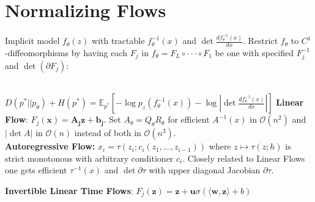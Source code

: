 
\section*{Normalizing Flows}
Implicit model $f_\theta(z)$ with tractable $f_\theta^{-1}(x)$ and $\det \frac{d f_\theta^{-1}(x)}{d x}$. Restrict $f_\theta$ to $C^1$-diffeomorphisms by having each $F_j$ in
$f_\theta=F_L\circ\cdot\cdot\cdot\circ F_1$ be one with specified $F_j^{-1}$ and $\det(\partial F_j)$:\\
\\

$D(p^*||p_\theta) + H(p^*) = \mathbb E_{p^*}[- \log p_z(f_\theta^{-1}(x)) - \log | \det \frac{d f_\theta^{-1}(x)}{d x}|]$
\textbf{Linear Flow}: $F_j(\mathbf x)=\mathbf{A_jz+b_j}$. Set $A_\theta = Q_\theta R_\theta$ for efficient $A^{-1}(x)$ in $\mathcal{O}(n^2)$ and $|\det A|$ in $\mathcal{O}(n)$ instead of both in $\mathcal{O}(n^3)$.\\
\textbf{Autoregressive Flow:} $x_i = \tau(z_i; c_i(z_1, \ldots, z_{i-1}))$ where $z \mapsto \tau(z;h)$ is strict monotonous with arbitrary conditioner $c_i$. Closely related to Linear Flows one gets efficient $\tau^{-1}(x)$ and $\det \partial \tau$ with upper diagonal Jacobian $\partial \tau$. 

\textbf{Invertible Linear Time Flows}: $F_j(\mathbf z)=\mathbf z+\mathbf u\sigma(\mathbf{\langle w, z\rangle}+b)$ \\

\color{red}

